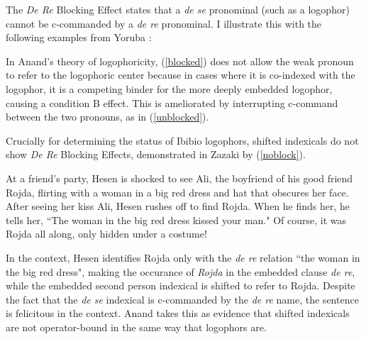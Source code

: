 \documentclass[output=paper]{langscibook}
\begin{document}
The \textit{De Re} Blocking Effect \citep{Anand2006} states that a \textit{de se} pronominal (such as a logophor) cannot be c-commanded by a \textit{de re} pronominal. I illustrate this with the following examples from Yoruba \citep{Adesola2005}:
\begin{exe}
	\label{control}
	\label{blocked}
	\label{unblocked}
\end{exe}
In Anand's theory of logophoricity, (\ref{blocked}) does not allow the weak pronoun to refer to the logophoric center because in cases where it is co-indexed with the logophor, it is a competing binder for the more deeply embedded logophor, causing a condition B effect. This is ameliorated by interrupting c-command between the two pronouns, as in (\ref{unblocked}).

Crucially for determining the status of Ibibio logophors, shifted indexicals do not show \textit{De Re} Blocking Effects, demonstrated in Zazaki by (\ref{noblock}).

\begin{context}
At a friend's party, Hesen is shocked to see Ali, the boyfriend of his good friend Rojda, flirting with a woman in a big red dress and hat that obscures her face. After seeing her kiss Ali, Hesen rushes off to find Rojda. When he finds her, he tells her, ``The woman in the big red dress kissed your man." Of course, it was Rojda all along, only hidden under a costume!
\end{context}
\begin{exe}
	\label{noblock}
\end{exe}
In the context, Hesen identifies Rojda only with the \textit{de re} relation ``the woman in the big red dress", making the occurance of \textit{Rojda} in the embedded clause \textit{de re}, while the embedded second person indexical is shifted to refer to Rojda. Despite the fact that the \textit{de se} indexical is c-commanded by the \textit{de re} name, the sentence is felicitous in the context. Anand takes this as evidence that shifted indexicals are not operator-bound in the same way that logophors are.
\end{document}
